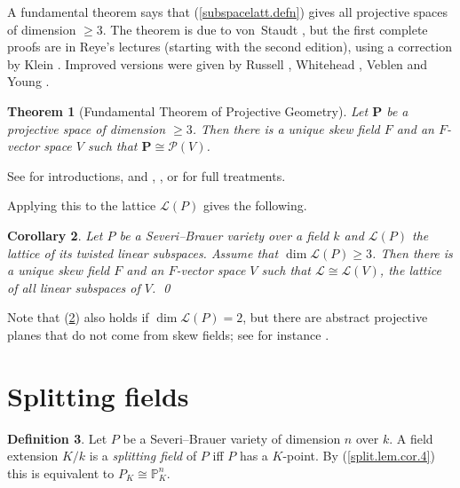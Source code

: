 \documentclass{amsart}
\newtheorem{thm}{Theorem}%
\newtheorem{cor}[thm]{Corollary}
\theoremstyle{definition}
\newtheorem{defn}[thm]{Definition}
\theoremstyle{remark}
\newcommand{\p}[0]{{\mathbb P}}
\begin{document}
A fundamental theorem says that 
(\ref{subspacelatt.defn}) gives all  projective spaces of dimension $\geq 3$.
The  theorem is due to  von~Staudt  \cite{vStaudt-2}, but
the first complete proofs are in 
Reye's lectures \cite{zbMATH02723115} (starting with the second edition), using a correction  by Klein \cite{zbMATH02716823}.
Improved versions were given by    Russell \cite{zbMATH02655800},
Whitehead \cite{whitehead},  
 Veblen and Young   \cite{MR1506049}. 



\begin{thm}[Fundamental Theorem of Projective Geometry] \label{veb-you.thm} Let  ${\mathbf P}$ be a projective space of dimension $\geq 3$. Then there is a unique  skew field $F$ and an $F$-vector space $V$ such that  ${\mathbf P}\cong {\mathcal P}(V)$. 
\end{thm}



See \cite{MR0172154, MR1153019} for introductions, and
 \cite[Chap.VI]{hodge-ped}, \cite{MR0052795, MR0082463}, or 
 \cite[Chap.5]{MR2264641}
 for full treatments.




Applying this to the lattice ${\mathcal L}(P)$ gives the following. 

\begin{cor} \label{inverse.chat.sec.2}
 Let  $P$ be a Severi--Brauer variety over a field $k$ and 
${\mathcal L}(P)$ the lattice of its twisted linear subspaces.
Assume that $\dim {\mathcal L}(P)\geq 3$.
 Then there is a  unique  skew field $F$ and an $F$-vector space $V$ such that  ${\mathcal L}\cong {\mathcal L}(V)$, the lattice of all linear subspaces of $V$. \qed
\end{cor}

Note that (\ref{inverse.chat.sec.2}) also holds if $\dim {\mathcal L}(P)=2$, but
 there are abstract
 projective planes that do not come from skew fields; see for instance \cite[Chap.6]{MR2264641}.





\section{Splitting fields}\label{sec.split.f}



\begin{defn} Let $P$ be a Severi--Brauer variety of dimension $n$ over $k$.
  A field extension $K/k$ is a {\it splitting field} of $P$ iff
  $P$ has a $K$-point. By (\ref{split.lem.cor.4}) this is equivalent to  $P_K\cong \p^n_K$.
  \end{defn}
\end{document}
